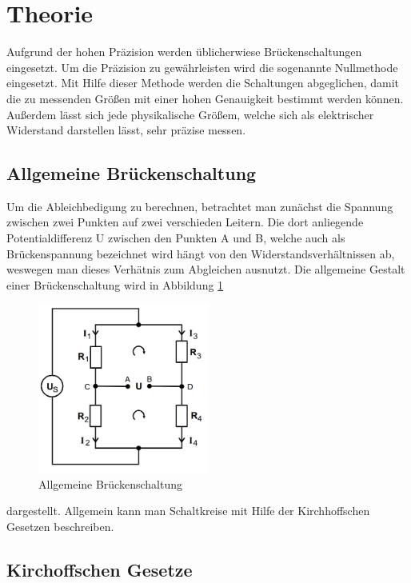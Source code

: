 \section{Theorie}
\label{sec:Theorie}
Aufgrund der hohen Präzision werden üblicherwiese Brückenschaltungen eingesetzt. Um die Präzision zu gewährleisten wird die sogenannte Nullmethode eingesetzt.
Mit Hilfe dieser Methode werden die Schaltungen abgeglichen, damit die zu messenden Größen mit einer hohen Genauigkeit bestimmt werden können. Außerdem lässt sich jede
physikalische Größem, welche sich als elektrischer Widerstand darstellen lässt, sehr präzise messen.
\subsection{Allgemeine Brückenschaltung}
Um die Ableichbedigung zu berechnen, betrachtet man zunächst die Spannung zwischen zwei Punkten auf zwei verschieden Leitern. Die dort anliegende Potentialdifferenz U
zwischen den Punkten A und B, welche auch als Brückenspannung bezeichnet wird hängt von den Widerstandsverhältnissen ab,
weswegen man dieses Verhätnis zum Abgleichen ausnutzt.
Die allgemeine Gestalt einer Brückenschaltung wird in  Abbildung \ref{fig:allgBrücke}
\begin{figure}
    \centering
    \caption{Allgemeine Brückenschaltung} 
    \label{fig:allgBrücke}
    \includegraphics[width = 0.5\textwidth]{bridges/genbridge.png}
\end{figure}
dargestellt. Allgemein kann man Schaltkreise mit Hilfe der Kirchhoffschen Gesetzen beschreiben.
\subsection{Kirchoffschen Gesetze}
